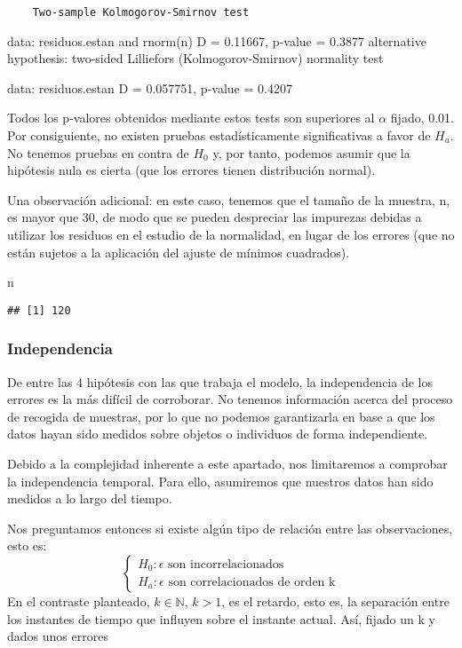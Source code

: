 \documentclass[
]{article}
\newenvironment{Shaded}{\begin{snugshade}}{\end{snugshade}}
\newcommand{\NormalTok}[1]{#1}
\begin{document}
\begin{verbatim}
    Two-sample Kolmogorov-Smirnov test
\end{verbatim}

data: residuos.estan and rnorm(n) D = 0.11667, p-value = 0.3877
alternative hypothesis: two-sided Lilliefors (Kolmogorov-Smirnov)
normality test

data: residuos.estan D = 0.057751, p-value = 0.4207

Todos los p-valores obtenidos mediante estos tests son superiores al
\(\alpha\) fijado, 0.01. Por consiguiente, no existen pruebas
estadísticamente significativas a favor de \(H_a\). No tenemos pruebas
en contra de \(H_0\) y, por tanto, podemos asumir que la hipótesis nula
es cierta (que los errores tienen distribución normal).

Una observación adicional: en este caso, tenemos que el tamaño de la
muestra, n, es mayor que 30, de modo que se pueden despreciar las
impurezas debidas a utilizar los residuos en el estudio de la
normalidad, en lugar de los errores (que no están sujetos a la
aplicación del ajuste de mínimos cuadrados).

\begin{Shaded}
\begin{Highlighting}[]
\NormalTok{n}
\end{Highlighting}
\end{Shaded}

\begin{verbatim}
## [1] 120
\end{verbatim}

\hypertarget{independencia}{%
\subsubsection{Independencia}\label{independencia}}

De entre las 4 hipótesis con las que trabaja el modelo, la independencia
de los errores es la más difícil de corroborar. No tenemos información
acerca del proceso de recogida de muestras, por lo que no podemos
garantizarla en base a que los datos hayan sido medidos sobre objetos o
individuos de forma independiente.

Debido a la complejidad inherente a este apartado, nos limitaremos a
comprobar la independencia temporal. Para ello, asumiremos que nuestros
datos han sido medidos a lo largo del tiempo.

Nos preguntamos entonces si existe algún tipo de relación entre las
observaciones, esto es: \[
\begin{cases}
H_0: \epsilon\text{ son incorrelacionados}\\
H_a: \epsilon\text{ son correlacionados de orden k}
\end{cases}
\] En el contraste planteado, \(k\in\mathbb{N}\), \(k>1\), es el
retardo, esto es, la separación entre los instantes de tiempo que
influyen sobre el instante actual. Así, fijado un k y dados unos errores
\end{document}
